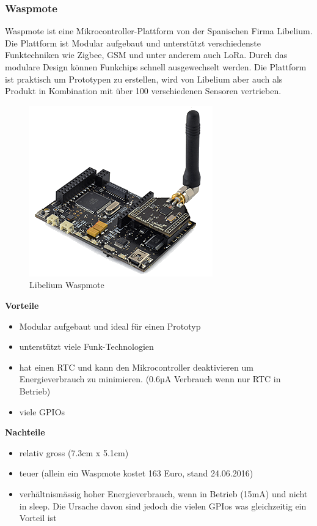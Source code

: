 \subsubsection*{Waspmote}
Waspmote ist eine Mikrocontroller-Plattform von der Spanischen Firma Libelium. Die Plattform ist Modular aufgebaut und unterstützt verschiedenste Funktechniken wie Zigbee, GSM und unter anderem auch LoRa. Durch das modulare Design können Funkchips schnell ausgewechselt werden. Die Plattform ist praktisch um Prototypen zu erstellen, wird von Libelium aber auch als Produkt in Kombination mit über 100 verschiedenen Sensoren vertrieben.
\begin{figure}[H]
     \centering
        \includegraphics[scale=1.0]{pictures/Waspmote.png}
    \caption{Libelium Waspmote}
    \label{fig:Waspmote}
\end{figure}

\textbf{Vorteile}
\begin{itemize}
\item Modular aufgebaut und ideal für einen Prototyp
\item unterstützt viele Funk-Technologien
\item hat einen RTC und kann den Mikrocontroller deaktivieren um Energieverbrauch zu minimieren. (0.6µA Verbrauch wenn nur RTC in Betrieb)
\item viele GPIOs 
\end{itemize}
\textbf{Nachteile}
\begin{itemize}
\item relativ gross (7.3cm x 5.1cm)
\item teuer (allein ein Waspmote kostet 163 Euro, stand 24.06.2016)
\item verhältnismässig hoher Energieverbrauch, wenn in Betrieb (15mA) und nicht in sleep. Die Ursache davon sind jedoch die vielen GPIos was gleichzeitig ein Vorteil ist
\end{itemize}

